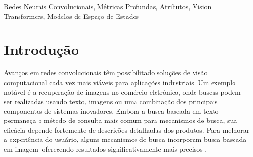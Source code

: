 \documentclass[conference]{IEEEtran}
\begin{document}
\begin{abstract}
Este estudo aborda o desafio de extrair efetivamente o conte\'{u}do de imagens com base em atributos espec\'{i}ficos: cor, textura ou sua combina\c{c}\~{a}o---uma \'{a}rea de particular relev\^{a}ncia para aplica\c{c}\~{o}es de com\'{e}rcio eletr\^{o}nico. Modelos de aprendizado profundo s\~{a}o avaliados para compreender a sensibilidade de suas camadas a esses atributos. Experimentos foram conduzidos para avaliar representa\c{c}\~{o}es espec\'{i}ficas de camadas e determinar sua efic\'{a}cia na captura de caracter\'{i}sticas de cor, textura e combinadas. O estudo tamb\'{e}m explora a adequa\c{c}\~{a}o de ResNet-50, VGG-16, iBOT, VMamba e LMFCN como arquiteturas backbone. Os resultados indicam que camadas iniciais s\~{a}o mais eficazes para classifica\c{c}\~{a}o de cor, enquanto camadas mais profundas se destacam no reconhecimento de textura. O iBOT alcan\c{c}ou a maior acur\'{a}cia em textura (97,20\%), enquanto ResNet-50 e iBOT empataram na melhor acur\'{a}cia em cor (95,87\%). Al\'{e}m disso, investigamos se a fus\~{a}o de caracter\'{i}sticas early-deep melhora o desempenho, concluindo que a simples concatena\c{c}\~{a}o n\~{a}o supera representa\c{c}\~{o}es especializadas de camada \'{u}nica.
\end{abstract}

\begin{IEEEkeywords}
Redes Neurais Convolucionais, M\'{e}tricas Profundas, Atributos, Vision Transformers, Modelos de Espa\c{c}o de Estados
\end{IEEEkeywords}

\section{Introdu\c{c}\~{a}o}

Avan\c{c}os em redes convolucionais t\^{e}m possibilitado solu\c{c}\~{o}es de vis\~{a}o computacional cada vez mais vi\'{a}veis para aplica\c{c}\~{o}es industriais. Um exemplo not\'{a}vel \'{e} a recupera\c{c}\~{a}o de imagens no com\'{e}rcio eletr\^{o}nico, onde buscas podem ser realizadas usando texto, imagens ou uma combina\c{c}\~{a}o dos principais componentes de sistemas inovadores. Embora a busca baseada em texto permane\c{c}a o m\'{e}todo de consulta mais comum para mecanismos de busca, sua efic\'{a}cia depende fortemente de descri\c{c}\~{o}es detalhadas dos produtos. Para melhorar a experi\^{e}ncia do usu\'{a}rio, alguns mecanismos de busca incorporam busca baseada em imagem, oferecendo resultados significativamente mais precisos \cite{b1}.
\end{document}
